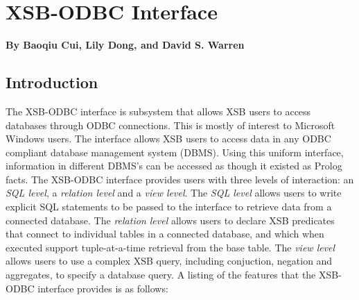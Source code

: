 \chapter{XSB-ODBC Interface} \label{odbc_interface}

\begin{center}
{\Large {\bf By Baoqiu Cui, Lily Dong, and David S. Warren }}
\end{center}

\section{Introduction}

The XSB-ODBC interface is subsystem that allows XSB users to access
databases through ODBC connections.  This is mostly of interest to
Microsoft Windows users.  The interface allows XSB users to access
data in any ODBC compliant database management system (DBMS). Using
this uniform interface, information in different DBMS's can be
accessed as though it existed as Prolog facts. The XSB-ODBC interface
provides users with three levels of interaction: an {\it SQL level}, a
{\it relation level} and a {\it view level}.  The {\it SQL level}
allows users to write explicit SQL statements to be passed to the
interface to retrieve data from a connected database.  The {\it
relation level} allows users to declare XSB predicates that connect to
individual tables in a connected database, and which when executed
support tuple-at-a-time retrieval from the base table.  The {\it view
level} allows users to use a complex XSB query, including conjuction,
negation and aggregates, to specify a database query.  A listing of
the features that the XSB-ODBC interface provides is as follows:
